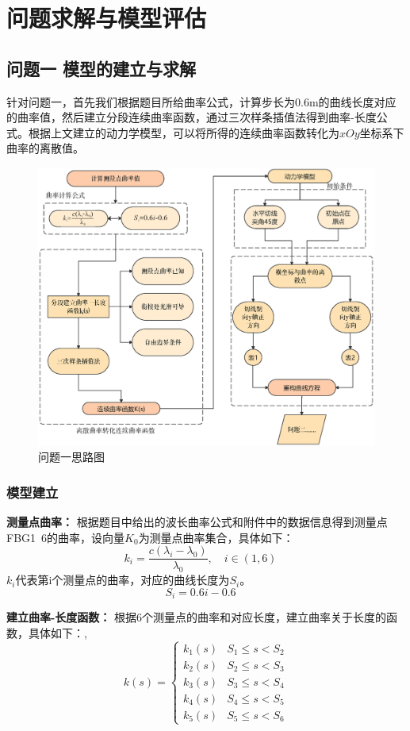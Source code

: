 \documentclass[withoutpreface,bwprint]{cumcmthesis}
\begin{document}
\section{问题求解与模型评估}

\subsection{问题一 模型的建立与求解}
针对问题一，首先我们根据题目所给曲率公式，计算步长为$0.6$m的曲线长度对应的曲率值，然后建立分段连续曲率函数，通过三次样条插值法得到曲率-长度公式。根据上文建立的动力学模型，可以将所得的连续曲率函数转化为$xOy$坐标系下曲率的离散值。

\begin{figure}[!h]
\centering
\includegraphics[width=.9\textwidth]{1mind.eps}
\caption{问题一思路图}
\end{figure}

\subsubsection{模型建立}
\textbf{测量点曲率：}  根据题目中给出的波长曲率公式和附件中的数据信息得到测量点FBG1~6的曲率，设向量$K_0$为测量点曲率集合，具体如下：
\begin{equation}
k_i=\frac{c\left(\lambda_i-\lambda_0\right)}{\lambda_0}, \quad i \in(1 , 6)\quad
\end{equation}
$k_i$代表第i个测量点的曲率，对应的曲线长度为$S_i$。
\begin{equation}
S_i=0.6 i-0.6\quad
\end{equation}

\textbf{建立曲率-长度函数：}  根据6个测量点的曲率和对应长度，建立曲率关于长度的函数，具体如下：,
\begin{equation}
k(s)=\left\{\begin{array}{lc}
k_1(s) & S_1 \leqslant s<S_2 \\
k_2(s) & S_2 \leqslant s<S_3 \\
k_3(s) & S_3 \leqslant s<S_4 \\
k_4(s) & S_4 \leqslant s<S_5 \\
k_5(s) & S_5 \leqslant s<S_6 
\end{array}\right.
\end{equation}
\end{document}

